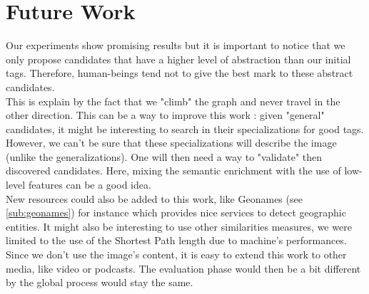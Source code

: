 
\chapter{Future Work} %

\label{chapter:FutureWork} %


Our experiments show promising results but it is important to notice that we only propose candidates that have a higher level of abstraction than our initial tags. Therefore, human-beings tend not to give the best mark to these abstract candidates.\\

This is explain by the fact that we "climb" the graph and never travel in the other direction. This can be a way to improve this work : given "general" candidates, it might be interesting to search in their specializations for good tags. However, we can't be sure that these specializations will describe the image (unlike the generalizations). One will then need a way to "validate" then discovered candidates. Here, mixing the semantic enrichment with the use of low-level features can be a good idea.\\

New resources could also be added to this work, like Geonames (see \ref{sub:geonames}) for instance which provides nice services to detect geographic entities. It might also be interesting to use other similarities measures, we were limited to the use of the Shortest Path length due to machine's performances.\\

Since we don't use the image's content, it is easy to extend this work to other media, like video or podcasts. The evaluation phase would then be a bit different by the global process would stay the same.